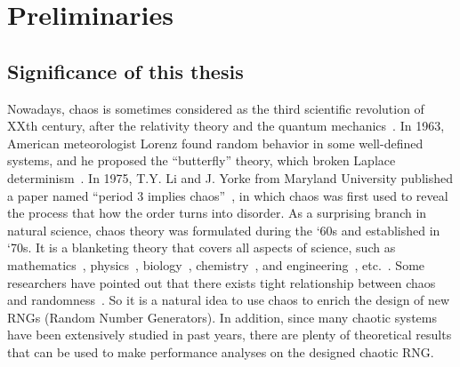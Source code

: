 \part{Preliminaries}

\chapter{Significance of this thesis}
\minitoc
Nowadays, chaos is sometimes considered as the third scientific revolution of XXth century, after the relativity theory and the quantum mechanics~\cite{Pulch20121477}. In 1963, American meteorologist Lorenz found random behavior in some well-defined systems, and he proposed the ``butterfly'' theory, which broken Laplace determinism~\cite{begining_chaos}. In 1975, T.Y. Li and J. Yorke from Maryland University published a paper named ``period 3 implies chaos''~\cite{liyorke1975}, in which chaos was first used to reveal the process that how the order turns into disorder. 
As a surprising branch in natural science, chaos theory was formulated during the `60s and established in `70s. It is a blanketing theory that covers all aspects of science, such as mathematics~\cite{Pulch20121477, Elnashaie20073295, Chen20117258}, physics~\cite{Tian1997128,Chotorlishvili2010103}, biology~\cite{Yu2004341,Su12231}, chemistry~\cite{ElSayed2013148,Wu2009632}, and engineering~\cite{Lee199671,Aihara2012199}, etc.~\cite{Wu20104363,Du20092493}. Some researchers have pointed out that there exists tight relationship between chaos and randomness~\cite{Sunada2012190,Gon1999109}. So it is a natural idea to use chaos to enrich the design of new RNGs (Random Number Generators). In addition, since many chaotic systems have been extensively studied in past years, there are plenty of theoretical results that can be used to make performance analyses on the designed chaotic RNG. 



